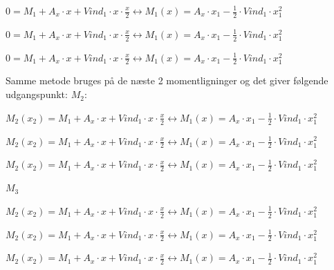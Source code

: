 \begin{center}
	$0 = M_1 + A_x \cdot x + Vind_1\cdot x\cdot \frac{x}{2} \leftrightarrow M_1(x) = A_x\cdot x_1 -\frac{1}{2}\cdot Vind_1 \cdot x_1^2$
\end{center}

\begin{center}
	$0 = M_1 + A_x \cdot x + Vind_1\cdot x\cdot \frac{x}{2} \leftrightarrow M_1(x) = A_x\cdot x_1 -\frac{1}{2}\cdot Vind_1 \cdot x_1^2$
\end{center}

\begin{center}
	$0 = M_1 + A_x \cdot x + Vind_1\cdot x\cdot \frac{x}{2} \leftrightarrow M_1(x) = A_x\cdot x_1 -\frac{1}{2}\cdot Vind_1 \cdot x_1^2$
\end{center}

Samme metode bruges på de næste 2 momentligninger og det giver følgende udgangspunkt: 
\newline
$M_2$:
\begin{center}
	$M_2(x_2) = M_1 + A_x \cdot x + Vind_1\cdot x\cdot \frac{x}{2} \leftrightarrow M_1(x) = A_x\cdot x_1 -\frac{1}{2}\cdot Vind_1 \cdot x_1^2$
\end{center}

\begin{center}
	$M_2(x_2) = M_1 + A_x \cdot x + Vind_1\cdot x\cdot \frac{x}{2} \leftrightarrow M_1(x) = A_x\cdot x_1 -\frac{1}{2}\cdot Vind_1 \cdot x_1^2$
\end{center}

\begin{center}
	$M_2(x_2) = M_1 + A_x \cdot x + Vind_1\cdot x\cdot \frac{x}{2} \leftrightarrow M_1(x) = A_x\cdot x_1 -\frac{1}{2}\cdot Vind_1 \cdot x_1^2$
\end{center}

$M_3$ 

\begin{center}
	$M_2(x_2) = M_1 + A_x \cdot x + Vind_1\cdot x\cdot \frac{x}{2} \leftrightarrow M_1(x) = A_x\cdot x_1 -\frac{1}{2}\cdot Vind_1 \cdot x_1^2$
\end{center}

\begin{center}
	$M_2(x_2) = M_1 + A_x \cdot x + Vind_1\cdot x\cdot \frac{x}{2} \leftrightarrow M_1(x) = A_x\cdot x_1 -\frac{1}{2}\cdot Vind_1 \cdot x_1^2$
\end{center}

\begin{center}
	$M_2(x_2) = M_1 + A_x \cdot x + Vind_1\cdot x\cdot \frac{x}{2} \leftrightarrow M_1(x) = A_x\cdot x_1 -\frac{1}{2}\cdot Vind_1 \cdot x_1^2$
\end{center}

